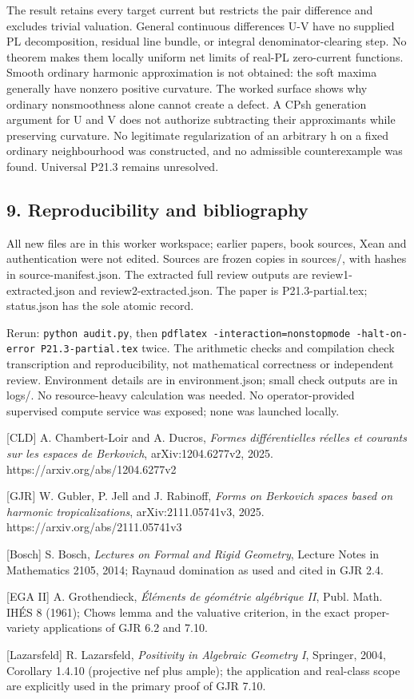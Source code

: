 \documentclass[
  11pt,
]{article}
\begin{document}
The result retains every target current but restricts the pair
difference and excludes trivial valuation. General continuous
differences U-V have no supplied PL decomposition, residual line bundle,
or integral denominator-clearing step. No theorem makes them locally
uniform net limits of real-PL zero-current functions. Smooth ordinary
harmonic approximation is not obtained: the soft maxima generally have
nonzero positive curvature. The worked surface shows why ordinary
nonsmoothness alone cannot create a defect. A CPsh generation argument
for U and V does not authorize subtracting their approximants while
preserving curvature. No legitimate regularization of an arbitrary h on
a fixed ordinary neighbourhood was constructed, and no admissible
counterexample was found. Universal P21.3 remains unresolved.

\subsection{9. Reproducibility and
bibliography}\label{reproducibility-and-bibliography}

All new files are in this worker workspace; earlier papers, book
sources, Xean and authentication were not edited. Sources are frozen
copies in sources/, with hashes in source-manifest.json. The extracted
full review outputs are review1-extracted.json and
review2-extracted.json. The paper is P21.3-partial.tex; status.json has
the sole atomic record.

Rerun: \texttt{python\ audit.py}, then
\texttt{pdflatex\ -interaction=nonstopmode\ -halt-on-error\ P21.3-partial.tex}
twice. The arithmetic checks and compilation check transcription and
reproducibility, not mathematical correctness or independent review.
Environment details are in environment.json; small check outputs are in
logs/. No resource-heavy calculation was needed. No operator-provided
supervised compute service was exposed; none was launched locally.

{[}CLD{]} A. Chambert-Loir and A. Ducros, \emph{Formes différentielles
réelles et courants sur les espaces de Berkovich}, arXiv:1204.6277v2,
2025. https://arxiv.org/abs/1204.6277v2

{[}GJR{]} W. Gubler, P. Jell and J. Rabinoff, \emph{Forms on Berkovich
spaces based on harmonic tropicalizations}, arXiv:2111.05741v3, 2025.
https://arxiv.org/abs/2111.05741v3

{[}Bosch{]} S. Bosch, \emph{Lectures on Formal and Rigid Geometry},
Lecture Notes in Mathematics 2105, 2014; Raynaud domination as used and
cited in GJR 2.4.

{[}EGA II{]} A. Grothendieck, \emph{Éléments de géométrie algébrique
II}, Publ. Math. IHÉS 8 (1961); Chow\textquotesingle s lemma and the
valuative criterion, in the exact proper-variety applications of GJR 6.2
and 7.10.

{[}Lazarsfeld{]} R. Lazarsfeld, \emph{Positivity in Algebraic Geometry
I}, Springer, 2004, Corollary 1.4.10 (projective nef plus ample); the
application and real-class scope are explicitly used in the primary
proof of GJR 7.10.
\end{document}
